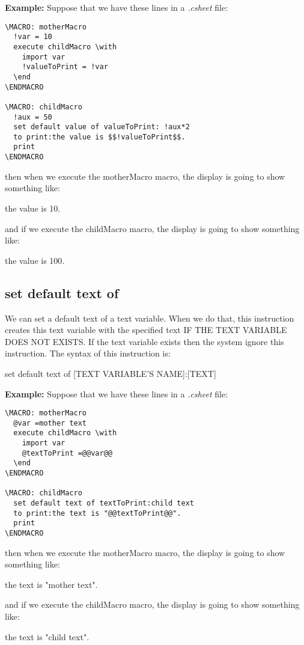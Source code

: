 \documentclass[11pt,a4paper,openright,oneside]{book}
\newenvironment{ex}
{
  \setlength{\parindent}{0cm}
  \large \textbf{Example:} \normalsize 
}
{}
\begin{document}
\begin{ex} Suppose that we have these lines in a \textit{.csheet} file:
  \begin{lstlisting}
\MACRO: motherMacro
  !var = 10
  execute childMacro \with
    import var
    !valueToPrint = !var
  \end
\ENDMACRO

\MACRO: childMacro
  !aux = 50
  set default value of valueToPrint: !aux*2
  to print:the value is $$!valueToPrint$$.
  print
\ENDMACRO
  \end{lstlisting}
then when we execute the \textsf{motherMacro} macro, the display is going to show something like:
\vspace{5px}

\textsf{the value is 10.}

and if we execute the \textsf{childMacro} macro, the display is going to show something like:
\vspace{5px}

\textsf{the value is 100.}
  
\end{ex}


\subsection{\textsf{set default text of}}

We can set a default text of a text variable. When we do that, this instruction creates this text variable with the specified text IF THE TEXT VARIABLE DOES NOT EXISTS. If the text variable exists then the system ignore this instruction. The syntax of this instruction is:
\begin{center} \textsf{set default text of \textsc{\scriptsize[TEXT VARIABLE'S NAME]}:\textsc{\scriptsize[TEXT]}} \end{center}

\begin{ex} Suppose that we have these lines in a \textit{.csheet} file:
  \begin{lstlisting}
\MACRO: motherMacro
  @var =mother text
  execute childMacro \with
    import var
    @textToPrint =@@var@@
  \end
\ENDMACRO

\MACRO: childMacro
  set default text of textToPrint:child text
  to print:the text is "@@textToPrint@@".
  print
\ENDMACRO
  \end{lstlisting}
then when we execute the \textsf{motherMacro} macro, the display is going to show something like:
\vspace{5px}

\textsf{the text is "mother text".}

and if we execute the \textsf{childMacro} macro, the display is going to show something like:
\vspace{5px}

\textsf{the text is "child text".}
  
\end{ex}
\end{document}
